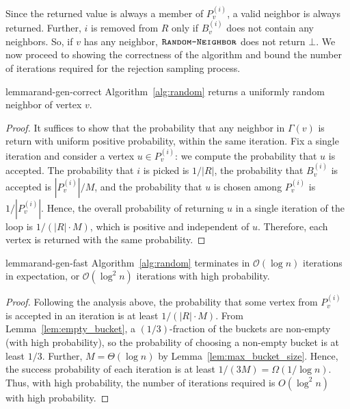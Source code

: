 Since the returned value is always a member of $P_v^{(i)}$,
a valid neighbor is always returned.
Further, $i$ is removed from $R$ only if $B_v^{(i)}$ does not contain any neighbors.
So, if $v$ has any neighbor, $\texttt{\textsc{Random-Neighbor}}$ does not return $\bot$.
We now proceed to showing the correctness of the algorithm and bound the number of iterations required for the rejection sampling process.
\begin{restatable}{lemma}{rand-gen-correct}
\label{lem:rand_gen_correct}
Algorithm~\ref{alg:random} returns a uniformly random neighbor of vertex $v$.
\end{restatable}
\begin{proof}
It suffices to show that the probability that any neighbor in $\Gamma(v)$ is return with uniform positive probability, within the same iteration.
Fix a single iteration and consider a vertex $u\in P_v^{(i)}$:
we compute the probability that $u$ is accepted.
The probability that $i$ is picked is $1/|R|$, the probability that $B_v^{(i)}$ is accepted is $|P_v^{(i)}|/M$, and the probability that $u$ is chosen among $P_v^{(i)}$ is $1/|P_v^{(i)}|$.
Hence, the overall probability of returning $u$ in a single iteration
of the loop is $1/(|R|\cdot M)$, which is positive and independent of $u$.
Therefore, each vertex is returned with the same probability.
\end{proof}

\begin{restatable}{lemma}{rand-gen-fast}
\label{lem:rand_gen_fast}
Algorithm~\ref{alg:random} terminates in $\mathcal{O}(\log n)$ iterations in expectation, or $\mathcal{O}(\log^2 n)$ iterations with high probability.
\end{restatable}
\begin{proof}
Following the analysis above, the probability that some vertex from $P_v^{(i)}$ is accepted in an iteration is at least $1/(|R|\cdot M)$. From Lemma~\ref{lem:empty_bucket}, a $(1/3)$-fraction of the buckets are non-empty (with high probability), so the probability of choosing a non-empty bucket is at least $1/3$. Further, $M = \Theta(\log n)$ by Lemma~\ref{lem:max_bucket_size}. Hence, the success probability of each iteration is at least $1/(3M)=\Omega(1/\log n)$. Thus, with high probability, the number of iterations required is  $O(\log^2 n)$ with high probability.
\end{proof}






